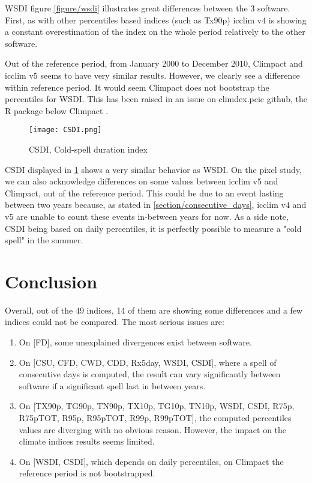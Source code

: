 \documentclass[a4paper,11pt]{article}
\begin{document}
        WSDI figure \ref{figure/wsdi} illustrates great differences between the 3 software.\\
        First, as with other percentiles based indices (such as Tx90p) icclim v4 is showing a constant overestimation of the index on the whole period relatively to the other software.

        Out of the reference period, from January 2000 to December 2010, Climpact and icclim v5 seems to have very similar results.
        However, we clearly see a difference within reference period. It would seem Climpact does not bootstrap the percentiles for WSDI.
        This has been raised in an issue on climdex.pcic github, the R package below Climpact \cite{gh/wsdi_issue}.
    
        \begin{figure}[h]
            \centering
            \texttt{[image: CSDI.png]}
            \caption{CSDI, Cold-spell duration index}
            \label{figure/csdi}
        \end{figure}

        CSDI displayed in \ref{figure/csdi} shows a very similar behavior as WSDI.
        On the pixel study, we can also acknowledge differences on some values between icclim v5 and Climpact, out of the reference period.
        This could be due to an event lasting between two years because, as stated in \ref{section/consecutive_days}, icclim v4 and v5 are unable to count these events in-between years for now.
        As a side note, CSDI being based on daily percentiles, it is perfectly possible to measure a "cold spell" in the summer.

\part{Conclusion}
    Overall, out of the 49 indices, 14 of them are showing some differences and a few indices could not be compared.
    The most serious issues are:
    \begin{enumerate}
        \item On [FD], some unexplained divergences exist between software.
        \item On [CSU, CFD, CWD, CDD, Rx5day, WSDI, CSDI], where a spell of consecutive days is computed, the result can vary significantly between software if a significant spell last in between years.
        \item On [TX90p, TG90p, TN90p, TX10p, TG10p, TN10p, WSDI, CSDI, R75p, R75pTOT, R95p, R95pTOT, R99p, R99pTOT], the computed percentiles values are diverging with no obvious reason. However, the impact on the climate indices results seems limited.
        \item On [WSDI, CSDI], which depends on daily percentiles, on Climpact the reference period is not bootstrapped.
    \end{enumerate}
\end{document}
